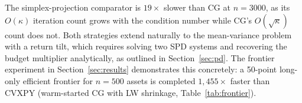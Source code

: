 The simplex-projection comparator is $19\times$ slower than CG at $n=3000$,
as its $O(\kappa)$ iteration count grows with the condition number while CG's $O(\sqrt\kappa)$
count does not. Both strategies extend naturally to the
mean-variance problem with a return tilt, which requires solving two SPD systems and
recovering the budget multiplier analytically, as outlined in Section~\ref{sec:pd}.
The frontier experiment in Section~\ref{sec:results} demonstrates this concretely:
a 50-point long-only efficient frontier for $n=500$ assets is completed
$1{,}455\times$ faster than CVXPY (warm-started CG with LW shrinkage, Table~\ref{tab:frontier}).
